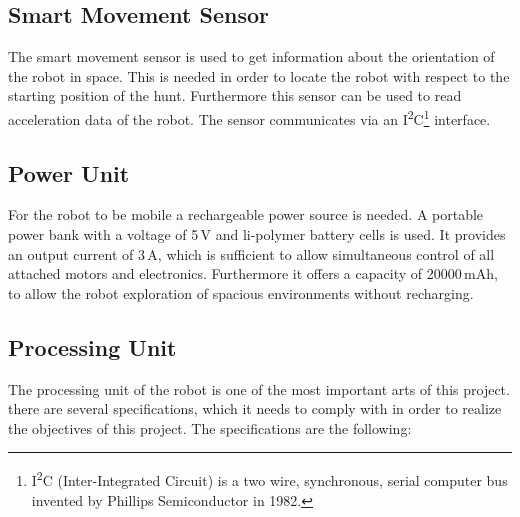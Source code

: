 \subsection{Smart Movement Sensor}\label{subsec:smart_movement_sensor}

The smart movement sensor is used to get information about the orientation of the robot in space. This is needed in order to locate the robot with respect to the starting position of the hunt. Furthermore this sensor can be used to read acceleration data of the robot. The sensor communicates via an I\textsuperscript{2}C\footnote{I\textsuperscript{2}C (Inter-Integrated Circuit) is a two wire, synchronous, serial computer bus invented by Phillips Semiconductor in 1982.} interface.

\subsection{Power Unit}\label{subsec:power_unit}

For the robot to be mobile a rechargeable power source is needed. A portable power bank with a voltage of 5\,V and li-polymer battery cells is used. It provides an output current of 3\,A, which is sufficient to allow simultaneous control of all attached motors and electronics. Furthermore it offers a capacity of 20000\,mAh, to allow the robot exploration of spacious environments without recharging.

\subsection{Processing Unit}\label{subsec:processing_unit}

The processing unit of the robot is one of the most important arts of this project. there are several specifications, which it needs to comply with in order to realize the objectives of this project. The specifications are the following:

